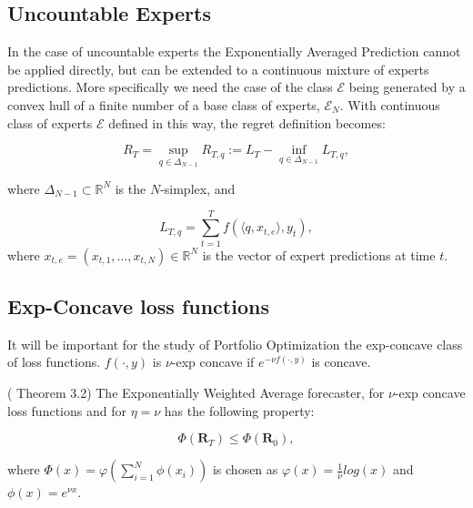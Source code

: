 \subsection{Uncountable Experts}\label{sec:uncountable_exp}

In the case of uncountable experts the Exponentially Averaged Prediction cannot be applied directly, but can be extended to a continuous mixture of experts predictions. More specifically we need the case of the class $\mathcal E$ being generated by a convex hull of a finite number of a base class of experts, $\mathcal E_N$.
With continuous class of experts $\mathcal E$ defined in this way, the regret definition becomes:

\begin{equation}
    R_T = \sup\limits_{q\in\Delta_{N-1}}R_{T,q}:=L_T-\inf\limits_{q\in\Delta_{N-1}}L_{T,q},
\end{equation}

where $\Delta_{N-1}\subset \mathbb R^{N}$ is the $N$-simplex, and 

$$L_{T,q}=\sum\limits_{t=1}^T f(\langle q,x_{t,e}\rangle,y_t),$$
where $x_{t,e}=(x_{t,1},\ldots,x_{t,N})\in\mathbb R^N$ is the vector of expert predictions at time $t$.
\subsection{Exp-Concave loss functions}\label{sec:exp-concave-mixture}
It will be important for the study of Portfolio Optimization the exp-concave class of loss functions.
$f(\cdot,y)$ is $\nu$-exp concave if $e^{-\nu f(\cdot,y)}$ is concave.

\begin{theorem}\label{th:General_Blk}(\cite{cesa2006prediction} Theorem 3.2)
The Exponentially Weighted Average forecaster, for $\nu$-exp concave loss functions and for $\eta=\nu$ has the following property:

$$\Phi(\mathbf R_T)\le \Phi(\mathbf R_0),$$

where $\Phi(x)=\varphi\left(\sum\limits_{i=1}^N\phi(x_i)\right)$ is chosen as $\varphi(x)=\frac{1}{\nu}log(x)$ and $\phi(x)=e^{\nu x}.$

\end{theorem}

